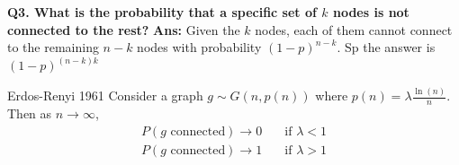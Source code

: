 \documentclass[./some_latex_template.tex]{subfiles}
\begin{document}
\noindent \textbf{Q3. What is the probability that a specific set of $k$ nodes is not connected to the rest?} \textbf{Ans:} Given the $k$ nodes, each of them cannot connect to the remaining $n-k$ nodes with probability $(1 - p)^{n - k}$. Sp the answer is $(1 - p)^{(n - k)k}$ \\

\begin{theorembox}{Erdos-Renyi 1961}{}
Consider a graph $g \sim G(n, p(n))$ where $p(n) = \lambda \frac{\ln(n)}{n}$. Then as $n \rightarrow \infty$,
\begin{align*}
	P(g \text{ connected}) \rightarrow 0 & \quad \text{if } \lambda < 1\\
	P(g \text{ connected}) \rightarrow 1 & \quad \text{if } \lambda > 1
\end{align*}
\end{theorembox}
\end{document}

